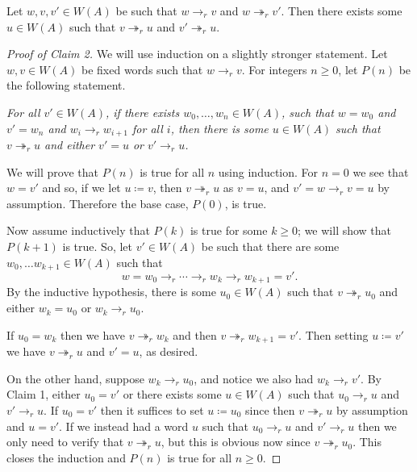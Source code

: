 \begin{solution}
\begin{claim}
		Let $w,v,v'\in W(A)$ be such that $w\to_r v$ and $w\twoheadrightarrow_r v'$. Then there exists some $u\in W(A)$ such that $v \twoheadrightarrow_r u$ and $v' \twoheadrightarrow_r u$. 
	\end{claim}
	\begin{proof}[Proof of Claim 2]
		We will use induction on a slightly stronger statement. Let $w,v\in W(A)$ be fixed words such that $w\to_r v$. For integers $n\geq 0$, let $P(n)$ be the following statement.
		\begin{center}
			\itshape
			For all $v'\in W(A)$, if there exists $w_0,\ldots,w_n\in W(A)$, such that $w=w_0$ and $v'=w_n$ and $w_i\to_r w_{i+1}$ for all $i$, then there is some $u\in W(A)$ such that $v\twoheadrightarrow_r u$ and either $v' = u$ or $v'\to_r u$.
		\end{center}
		We will prove that $P(n)$ is true for all $n$ using induction. For $n = 0$ we see that $w = v'$ and so, if we let $u \coloneqq v$, then $v\twoheadrightarrow_r u$ as $v = u$, and $v' = w\to_r v = u$ by assumption. Therefore the base case, $P(0)$, is true. 
		
		Now assume inductively that $P(k)$ is true for some $k\geq 0$; we will show that $P(k+1)$ is true. So, let $v'\in W(A)$ be such that there are some $w_0,\ldots w_{k+1} \in W(A)$ such that
		\[
			w = w_0 \to_r \cdots \to_r w_{k} \to_r w_{k+1} = v'.
		\]
		By the inductive hypothesis, there is some $u_0\in W(A)$ such that $v\twoheadrightarrow_r u_0$ and either $w_k = u_0$ or $w_k \to_r u_0$.
		
		If $u_0 = w_k$ then we have $v\twoheadrightarrow_r w_k$ and then $v\twoheadrightarrow_r w_{k+1} = v'$. Then setting $u\coloneqq v'$ we have $v\twoheadrightarrow_r u$ and $v' = u$, as desired.
		
		On the other hand, suppose $w_k\to_r u_0$, and notice we also had $w_k\to_r v'$. By Claim 1, either $u_0 = v'$ or there exists some $u\in W(A)$ such that $u_0\to_r u$ and $v'\to_r u$. If $u_0 = v'$ then it suffices to set $u\coloneqq u_0$ since then $v \twoheadrightarrow_r u$ by assumption and $u = v'$. If we instead had a word $u$ such that $u_0\to_r u$ and $v'\to_r u$ then we only need to verify that $v\twoheadrightarrow_r u$, but this is obvious now since $v\twoheadrightarrow_r u_0$. This closes the induction and $P(n)$ is true for all $n\geq 0$.
		

\end{proof}
\end{solution}
